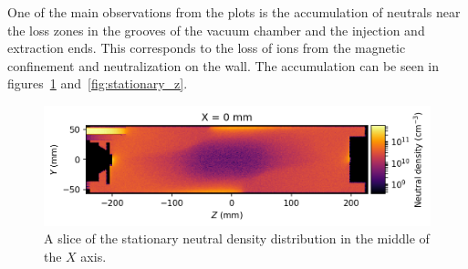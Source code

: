 \documentclass[a4paper,twoside,12pt]{article}
\begin{document}
One of the main observations from the plots is the accumulation of neutrals near the loss zones in the grooves of the vacuum chamber and the injection and extraction ends. This corresponds to the loss of ions from the magnetic confinement and neutralization on the wall. The accumulation can be seen in figures~\ref{fig:stationary_x} and~\ref{fig:stationary_z}.

\begin{figure}
    \centering
    \includegraphics[width=\textwidth]{images/stationary_x_middle.png}
    \caption{A slice of the stationary neutral density distribution in the middle of the $X$ axis.}
    \label{fig:stationary_x}
\end{figure}
\end{document}
